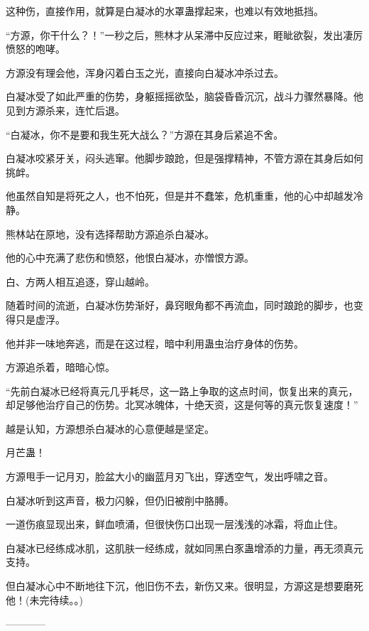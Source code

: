 \begin{this_body}
这种伤，直接作用，就算是白凝冰的水罩蛊撑起来，也难以有效地抵挡。

“方源，你干什么？！”一秒之后，熊林才从呆滞中反应过来，睚眦欲裂，发出凄厉愤怒的咆哮。

方源没有理会他，浑身闪着白玉之光，直接向白凝冰冲杀过去。

白凝冰受了如此严重的伤势，身躯摇摇欲坠，脑袋昏昏沉沉，战斗力骤然暴降。他见到方源杀来，连忙后退。

“白凝冰，你不是要和我生死大战么？”方源在其身后紧追不舍。

白凝冰咬紧牙关，闷头逃窜。他脚步踉跄，但是强撑精神，不管方源在其身后如何挑衅。

他虽然自知是将死之人，也不怕死，但是并不蠢笨，危机重重，他的心中却越发冷静。

熊林站在原地，没有选择帮助方源追杀白凝冰。

他的心中充满了悲伤和愤怒，他恨白凝冰，亦憎恨方源。

白、方两人相互追逐，穿山越岭。

随着时间的流逝，白凝冰伤势渐好，鼻窍眼角都不再流血，同时踉跄的脚步，也变得只是虚浮。

他并非一味地奔逃，而是在这过程，暗中利用蛊虫治疗身体的伤势。

方源追杀着，暗暗心惊。

“先前白凝冰已经将真元几乎耗尽，这一路上争取的这点时间，恢复出来的真元，却足够他治疗自己的伤势。北冥冰魄体，十绝天资，这是何等的真元恢复速度！”

越是认知，方源想杀白凝冰的心意便越是坚定。

月芒蛊！

方源甩手一记月刃，脸盆大小的幽蓝月刃飞出，穿透空气，发出呼啸之音。

白凝冰听到这声音，极力闪躲，但仍旧被削中胳膊。

一道伤痕显现出来，鲜血喷涌，但很快伤口出现一层浅浅的冰霜，将血止住。

白凝冰已经练成冰肌，这肌肤一经练成，就如同黑白豕蛊增添的力量，再无须真元支持。

但白凝冰心中不断地往下沉，他旧伤不去，新伤又来。很明显，方源这是想要磨死他！(未完待续。。)

------------

\end{this_body}

